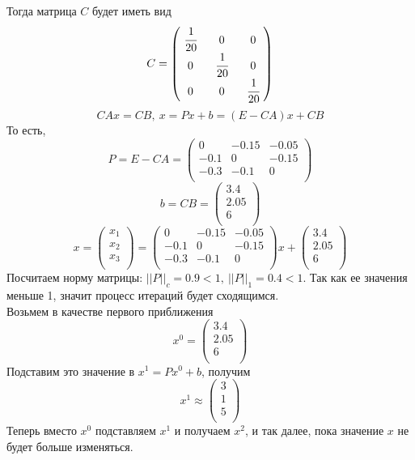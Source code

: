 \documentclass[12pt]{article}
\theoremstyle{definition}
\numberwithin{equation}{section}
\begin{document}
	\\
	Тогда матрица $C$ будет иметь вид
	\[C=\begin{pmatrix}
	~\cfrac{1}{20}~ & 0 & 0\\
	0 & ~\cfrac{1}{20}~ & 0\\
	0 & 0 & ~\cfrac{1}{20}~\\
	\end{pmatrix}\]
	$$CAx=CB,~x=Px+b=(E-CA)x+CB$$
	То есть,  
	\[P=E-CA=\begin{pmatrix}
	0 & -0.15 & -0.05\\
	-0.1 & 0 & -0.15\\
	-0.3 & -0.1 & 0\\
	\end{pmatrix}\]
	\[b=CB=\begin{pmatrix}
	3.4\\
	2.05\\
	6\\
	\end{pmatrix}\]
	\[x=\begin{pmatrix}
	x_1\\
	x_2\\
	x_3\\
	\end{pmatrix} = \begin{pmatrix}
	0 & -0.15 & -0.05\\
	-0.1 & 0 & -0.15\\
	-0.3 & -0.1 & 0\\
	\end{pmatrix}x + \begin{pmatrix}
	3.4\\
	2.05\\
	6\\
	\end{pmatrix}\]
	Посчитаем норму матрицы: $||P||_c=0.9<1,~||P||_1=0.4<1$. Так как ее значения меньше 1, значит процесс итераций будет сходящимся.\\
	Возьмем в качестве первого приближения 
	\[x^0=\begin{pmatrix}
	3.4\\
	2.05\\
	6\\
	\end{pmatrix}\]
	Подставим это значение в $x^1=Px^0+b$, получим 
	\[x^1 \approx \begin{pmatrix}
	3\\
	1\\
	5\\
	\end{pmatrix}\]
	Теперь вместо $x^0$ подставляем $x^1$ и получаем $x^2$, и так далее, пока значение $x$ не будет больше изменяться.\\ \\
\end{document}
